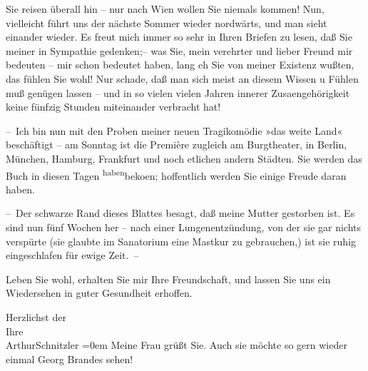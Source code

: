 \pstart
           Sie reisen überall hin – nur nach Wien wollen Sie
               niemals kommen! Nun, vielleicht führt uns der nächste Sommer wieder nordwärts, und
               man sieht einander wieder. Es freut mich immer so sehr in Ihren Briefen zu lesen, daß
               Sie meiner {\pb}in Sympathie gedenken;– was Sie, mein
               verehrter und lieber Freund mir bedeuten – mir schon bedeutet haben, lang eh Sie von
               meiner Existenz wußten, das fühlen Sie wohl! Nur schade, daß man sich meist an diesem
               Wissen u Fühlen muß genügen lassen – und in so vielen vielen Jahren innerer Zusa{\geminationm}engehörigkeit keine fünfzig Stunden miteinander
               verbracht hat!\pend
           
\pstart
           – Ich bin nun mit den Proben meiner {\pb}neuen
               Tragikomödie »das weite Land« beschäftigt – am
               Sonntag ist die Première zugleich am Burgtheater,
               in Berlin, München, Hamburg, Frankfurt und noch etlichen andern Städten. Sie werden das Buch in diesen Tagen \substVorne{}\textsuperscript{haben}\substDazwischen{}beko{\geminationm}en\substHinten{}; hoffentlich werden Sie einige Freude daran haben.\pend
           
\pstart
           – Der schwarze Rand dieses Blattes besagt, daß meine Mutter gestorben ist. Es sind nun fünf
               Wochen her – nach einer {\pb}Lungenentzündung, von der
               sie gar nichts verspürte (sie glaubte im Sanatorium eine Mastkur zu gebrauchen,) ist
               sie ruhig eingeschlafen für ewige Zeit. –\pend
           
\pstart
           Leben Sie wohl, erhalten Sie mir Ihre Freundschaft, und lassen Sie uns ein
               Wiedersehen in guter Gesundheit erhoffen.\pend
           
\pstart
           Herzlichst der{\\[\baselineskip]}Ihre{\\[\baselineskip]}\spacefill\mbox{ArthurSchnitzler}\pend
           \leftskip=0em{}
\pstart
           \noindent{}Meine Frau grüßt Sie. Auch
                  sie möchte so gern wieder einmal Georg Brandes sehen!\pend
           \endnumbering{}  
      